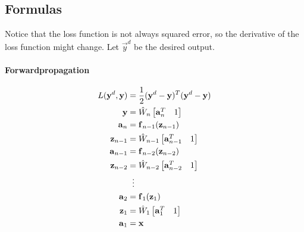 		\subsection{Formulas}
			Notice that the loss function is not always squared error, so the derivative of the loss function might change. Let \(\vec{y}^d\) be the desired output.
			
			\paragraph{Forwardpropagation}
				\begin{align}
					L(\vec{y}^d, \vec{y}) &= \frac{1}{2} (\vec{y}^d - \vec{y})^T (\vec{y}^d - \vec{y}) \\
					\vec{y} &= \hat{W}_n \begin{bmatrix} \vec{a}_n^T & 1 \end{bmatrix} \\
					\vec{a}_n &= \vec{f}_{n - 1} (\vec{z}_{n - 1}) \\
					\vec{z}_{n - 1} &= \hat{W}_{n - 1} \begin{bmatrix} \vec{a}_{n - 1}^T & 1 \end{bmatrix} \\
					\vec{a}_{n - 1} &= \vec{f}_{n - 2} (\vec{z}_{n - 2}) \\
					\vec{z}_{n - 2} &= \hat{W}_{n - 2} \begin{bmatrix} \vec{a}_{n - 2}^T & 1 \end{bmatrix} \\
					&\hspace{0.2cm}\vdots \\
					\vec{a}_2 &= \vec{f}_1(\vec{z}_1) \\
					\vec{z}_1 &= \hat{W}_1 \begin{bmatrix} \vec{a}_1^T & 1 \end{bmatrix} \\
					\vec{a}_1 &= \vec{x}
				\end{align}
			

